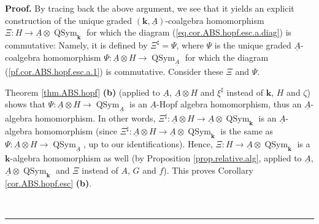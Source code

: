 \documentclass
[numbers=enddot,12pt,final,onecolumn,notitlepage,abstracton]{scrartcl}%
\theoremstyle{definition}
\newenvironment{proof}[1][Proof]{\noindent\textbf{#1.} }{\ \rule{0.5em}{0.5em}}
\begin{document}
\begin{proof}
By tracing back the above argument, we see that it yields an explicit
construction of the unique graded $\left(  \mathbf{k},\underline{A}\right)
$-coalgebra homomorphism $\Xi:H\rightarrow\underline{A}\otimes
\operatorname*{QSym}\nolimits_{\mathbf{k}}$ for which the diagram
(\ref{eq.cor.ABS.hopf.esc.a.diag}) is commutative: Namely, it is defined by
$\Xi^{\sharp}=\Psi$, where $\Psi$ is the unique graded $\underline{A}%
$-coalgebra homomorphism $\Psi:\underline{A}\otimes H\rightarrow
\operatorname*{QSym}\nolimits_{\underline{A}}$ for which the diagram
(\ref{pf.cor.ABS.hopf.esc.a.1}) is commutative. Consider these $\Xi$ and
$\Psi$.

Theorem \ref{thm.ABS.hopf} \textbf{(b)} (applied to $\underline{A}$,
$\underline{A}\otimes H$ and $\xi^{\sharp}$ instead of $\mathbf{k}$, $H$ and
$\zeta$) shows that $\Psi:\underline{A}\otimes H\rightarrow
\operatorname*{QSym}\nolimits_{\underline{A}}$ is an $\underline{A}$-Hopf
algebra homomorphism, thus an $\underline{A}$-algebra homomorphism. In other
words, $\Xi^{\sharp}:\underline{A}\otimes H\rightarrow\underline{A}%
\otimes\operatorname*{QSym}\nolimits_{\mathbf{k}}$ is an $\underline{A}%
$-algebra homomorphism (since $\Xi^{\sharp}:\underline{A}\otimes
H\rightarrow\underline{A}\otimes\operatorname*{QSym}\nolimits_{\mathbf{k}}$ is
the same as $\Psi:\underline{A}\otimes H\rightarrow\operatorname*{QSym}%
\nolimits_{\underline{A}}$, up to our identifications). Hence, $\Xi
:H\rightarrow\underline{A}\otimes\operatorname*{QSym}\nolimits_{\mathbf{k}}$
is a $\mathbf{k}$-algebra homomorphism as well (by Proposition
\ref{prop.relative.alg}, applied to $\underline{A}$, $\underline{A}%
\otimes\operatorname*{QSym}\nolimits_{\mathbf{k}}$ and $\Xi$ instead of $A$,
$G$ and $f$). This proves Corollary \ref{cor.ABS.hopf.esc} \textbf{(b)}.


\end{proof}
\end{document}
